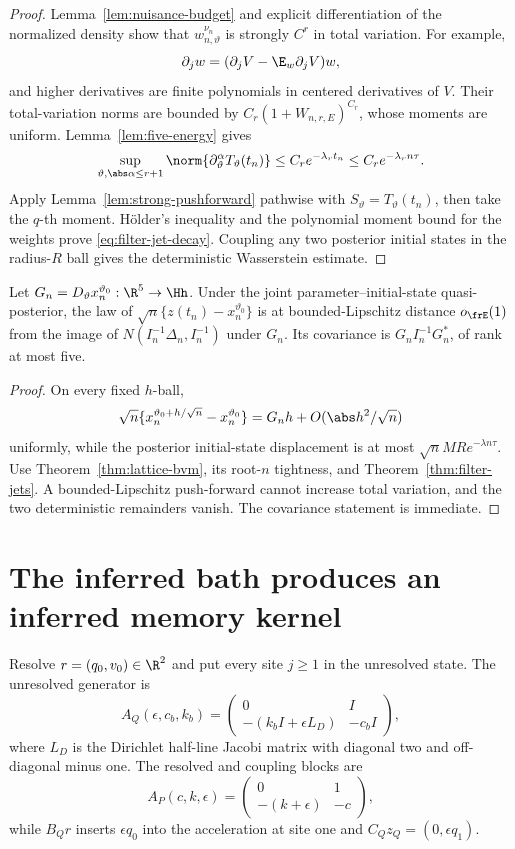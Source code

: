 \begin{proof}
Lemma~\ref{lem:nuisance-budget} and explicit differentiation of the normalized
density show that \(w_{n,\vartheta}^{\nu_n}\) is strongly \(C^r\) in total
variation.  For example,
\[
 \partial_jw=(\partial_jV-\E_w\partial_jV)w,
\]
and higher derivatives are finite polynomials in centered derivatives of
\(V\).  Their total-variation norms are bounded by
\(C_r(1+W_{n,r,E})^{C_r}\), whose moments are uniform.
Lemma~\ref{lem:five-energy} gives
\[
 \sup_{\vartheta,\abs\alpha\le r+1}
 \norm{\partial_\vartheta^\alpha T_\vartheta(t_n)}
 \le C_re^{-\lambda_rt_n}\le C_re^{-\lambda_rn\tau}.
\]
Apply Lemma~\ref{lem:strong-pushforward} pathwise with
\(S_\vartheta=T_\vartheta(t_n)\), then take the \(q\)-th moment.  H\"older's
inequality and the polynomial moment bound for the weights prove
\eqref{eq:filter-jet-decay}.  Coupling any two posterior initial states in the
radius-\(R\) ball gives the deterministic Wasserstein estimate.
\end{proof}

\begin{corollary}
\label{cor:state-image}
Let \(G_n=D_\vartheta x_n^{\vartheta_0}:\R^5\to\Hh\).  Under the joint
parameter--initial-state quasi-posterior, the law of
\(\sqrt n\{z(t_n)-x_n^{\vartheta_0}\}\) is at bounded-Lipschitz distance
\(o_{\frE}(1)\) from the image of
\(N(I_n^{-1}\Delta_n,I_n^{-1})\) under \(G_n\).  Its covariance is
\(G_nI_n^{-1}G_n^*\), of rank at most five.
\end{corollary}

\begin{proof}
On every fixed \(h\)-ball,
\[
 \sqrt n\{x_n^{\vartheta_0+h/\sqrt n}-x_n^{\vartheta_0}\}
 =G_nh+O(\abs h^2/\sqrt n)
\]
uniformly, while the posterior initial-state displacement is at most
\(\sqrt nMRe^{-\lambda n\tau}\).  Use Theorem~\ref{thm:lattice-bvm}, its
root-\(n\) tightness, and Theorem~\ref{thm:filter-jets}.  A bounded-Lipschitz
push-forward cannot increase total variation, and the two deterministic
remainders vanish.  The covariance statement is immediate.
\end{proof}

\section{The inferred bath produces an inferred memory kernel}
\label{sec:memory}

Resolve \(r=(q_0,v_0)\in\R^2\) and put every site \(j\ge1\) in the unresolved
state.  The unresolved generator is
\[
 A_Q(\epsilon,c_b,k_b)
 =\begin{pmatrix}0&I\\-(k_bI+\epsilon L_D)&-c_bI\end{pmatrix},
\]
where \(L_D\) is the Dirichlet half-line Jacobi matrix with diagonal two and
off-diagonal minus one.  The resolved and coupling blocks are
\[
 A_P(c,k,\epsilon)=
 \begin{pmatrix}0&1\\-(k+\epsilon)&-c\end{pmatrix},
\]
while \(B_Qr\) inserts \(\epsilon q_0\) into the acceleration at site one and
\(C_Qz_Q=(0,\epsilon q_1)\).

